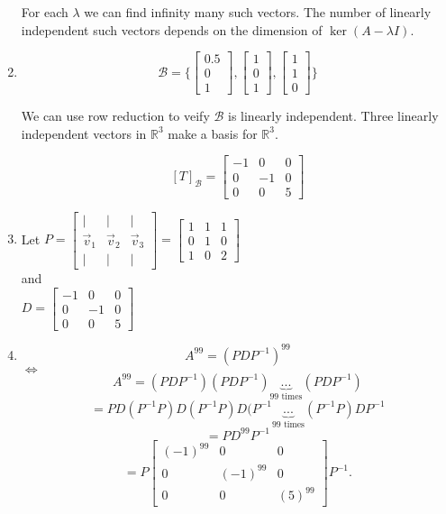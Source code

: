 \begin{SaveQuestion}
\begin{enumerate}
		For each $\lambda$ we can find infinity many such vectors. The number of linearly independent such vectors depends on the dimension of $\ker (A-\lambda I)$.
        \item $$\mathcal{B}=\{\begin{bmatrix} 0.5  \\ 0 \\ 1 \end{bmatrix}, \begin{bmatrix} 1  \\ 0 \\ 1 \end{bmatrix} , \begin{bmatrix} 1  \\ 1 \\ 0 \end{bmatrix}\}$$
		
We can use row reduction to veify $\mathcal B$ is linearly independent. Three linearly independent vectors in $\mathbb R^3$ make a basis for $\mathbb R^3$. 
		
		$$[T]_\mathcal B=\begin{bmatrix} -1 & 0 & 0 \\ 0 & -1 & 0 \\ 0 & 0 & 5 \end{bmatrix}$$
        \item Let $P=\begin{bmatrix} | & | & | \\ \vec{v}_1 & \vec{v}_2 & \vec{v}_3 \\ | & | & | \end{bmatrix}=\begin{bmatrix} 1 & 1 & 1 \\ 0 & 1 & 0 \\ 1 & 0 & 2 \end{bmatrix}$\\
		and\\
		$D=\begin{bmatrix} -1 & 0 & 0 \\ 0 & -1 & 0 \\ 0 & 0 & 5 \end{bmatrix}$
        \item $$ A^{99}=(PDP^{-1})^{99}$$
		$\Leftrightarrow$
		$$ A^{99}=(PDP^{-1})(PDP^{-1})\underbrace{...}_{\text{99 times}}(PDP^{-1})$$
		$$ =PD(P^{-1}P)D(P^{-1}P)D(P^{-1}\underbrace{...}_{\text{99 times}}(P^{-1}P)DP^{-1}$$
		$$=PD^{99}P^{-1}$$
		$$=P\begin{bmatrix} (-1)^{99} & 0 & 0 \\ 0 & (-1)^{99} & 0 \\ 0 & 0 & (5)^{99} \end{bmatrix}P^{-1}.$$
    \end{enumerate}
\end{SaveQuestion}

